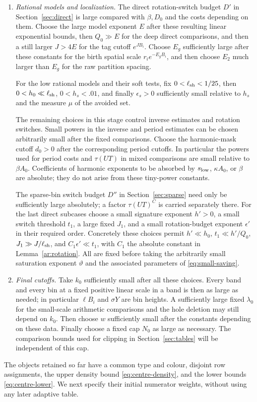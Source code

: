 \begin{enumerate}
\item \emph{Rational models and localization.}
The direct rotation-switch budget $D'$ in Section~\ref{sec:direct}
is large compared with $\beta,D_0$ and the costs depending on
them. Choose the large model exponent $E$ after these resulting
linear exponential bounds, then $Q_0\gg E$ for the deep direct
comparisons, and then a still larger $J>4E$ for the tag cutoff
$e^{JB_i}$. Choose $E_g$ sufficiently large after these constants
for the birth spatial scale $r_i e^{-E_gB_i}$, and then choose
$E_2$ much larger than $E_g$ for the raw partition spacing.

For the low rational models and their soft tests, fix
$0<\ell_{\rm sh}<1/25$, then $0<h_0\ll\ell_{\rm sh}$,
$0<h_s<.01$, and finally $\epsilon_s>0$ sufficiently small relative
to $h_s$ and the measure $\mu$ of the avoided set.

The remaining choices in this stage control inverse estimates and
rotation switches. Small powers in
the inverse and period estimates can be chosen arbitrarily small
after the fixed comparisons. Choose the harmonic-mask cutoff
$d_0>0$ after the corresponding period cutoffs. In particular the
powers used for period costs and $\tau(UT)$ in mixed comparisons
are small relative to $\beta A_0$. Coefficients of harmonic
exponents to be absorbed by $s_{\rm low}$, $\kappa A_0$, or
$\beta$ are absolute; they do not arise from these tiny-power
constants.

The sparse-bin switch budget $D''$ in Section~\ref{sec:sparse}
need only be sufficiently large absolutely; a factor
$\tau(UT)^C$ is carried separately there. For the last direct
subcases choose a small signature exponent $h'>0$, a small switch
threshold $t_1$, a large fixed $J_1$, and a small rotation-budget
exponent $\epsilon'$ in their required order. Concretely these
choices permit $h'\ll h_0$, $t_1\ll h'/Q_0$,
$J_1\gg J/\ell_{\rm sh}$, and $C_1\epsilon'\ll t_1$, with
$C_1$ the absolute constant in Lemma~\ref{ar:rotation}. All are fixed before taking the
arbitrarily small saturation exponent $\vartheta$ and the
associated parameters of \eqref{eq:small-saving}.

\item \emph{Final cutoffs.}
Take $k_0$ sufficiently small after all these choices. Every band
and every bin at a fixed positive linear scale in a band is then
as large as needed; in particular $\ell B_i$ and $\sigma Y$ are
bin heights. A sufficiently large fixed $\lambda_0$ for the
small-scale arithmetic comparisons and the hole deletion may
still depend on $k_0$. Then choose $w$ sufficiently small after
the constants depending on these data. Finally choose a fixed
cap $N_0$ as large as necessary. The comparison bounds used for
clipping in Section~\ref{sec:tables} will be independent of this
cap.
\end{enumerate}

The objects retained so far have a common type and colour, disjoint
row assignments, the upper density bound \eqref{eq:centre-density},
and the lower bounds \eqref{eq:centre-lower}. We next specify their
initial numerator weights, without using any later adaptive table.
